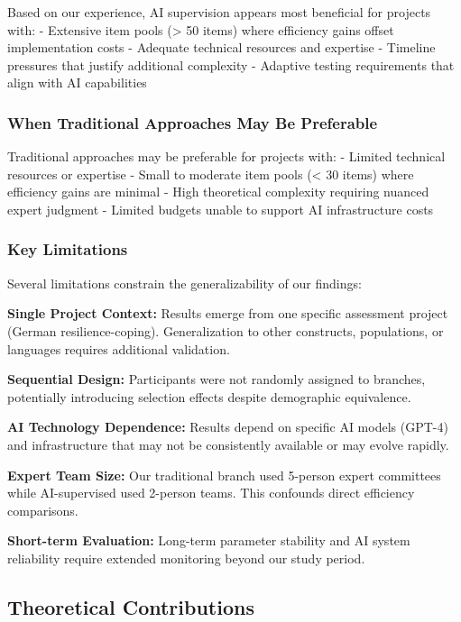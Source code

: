 \documentclass[12pt,a4paper]{article}
\begin{document}
Based on our experience, AI supervision appears most beneficial for projects with:
- Extensive item pools (> 50 items) where efficiency gains offset implementation costs
- Adequate technical resources and expertise
- Timeline pressures that justify additional complexity
- Adaptive testing requirements that align with AI capabilities

\subsubsection{When Traditional Approaches May Be Preferable}

Traditional approaches may be preferable for projects with:
- Limited technical resources or expertise
- Small to moderate item pools (< 30 items) where efficiency gains are minimal
- High theoretical complexity requiring nuanced expert judgment
- Limited budgets unable to support AI infrastructure costs

\subsubsection{Key Limitations}

Several limitations constrain the generalizability of our findings:

\textbf{Single Project Context:} Results emerge from one specific assessment project (German resilience-coping). Generalization to other constructs, populations, or languages requires additional validation.

\textbf{Sequential Design:} Participants were not randomly assigned to branches, potentially introducing selection effects despite demographic equivalence.

\textbf{AI Technology Dependence:} Results depend on specific AI models (GPT-4) and infrastructure that may not be consistently available or may evolve rapidly.

\textbf{Expert Team Size:} Our traditional branch used 5-person expert committees while AI-supervised used 2-person teams. This confounds direct efficiency comparisons.

\textbf{Short-term Evaluation:} Long-term parameter stability and AI system reliability require extended monitoring beyond our study period.

\subsection{Theoretical Contributions}
\end{document}
